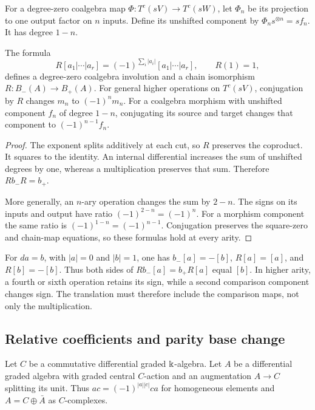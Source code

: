 For a degree-zero coalgebra map
$\Phi:T^c(sV)\to T^c(sW)$, let $\Phi_n$ be its projection to
one output factor on $n$ inputs.  Define its unshifted component by
$\Phi_n s^{\otimes n}=s f_n$.  It has degree $1-n$.

\begin{proposition}
\label{prop:olb-sign-change}
The formula
\[
 R[a_1|\cdots|a_r]=(-1)^{\sum_i|a_i|}[a_1|\cdots|a_r],
 \qquad R(1)=1,
\]
defines a degree-zero coalgebra involution and a chain isomorphism
$R:B_-(A)\to B_+(A)$.
For general higher operations on $T^c(sV)$, conjugation by $R$
changes $m_n$ to $(-1)^n m_n$.
For a coalgebra morphism with unshifted component $f_n$ of degree
$1-n$, conjugating its source and target changes that component
to $(-1)^{n-1}f_n$.
\end{proposition}

\begin{proof}
The exponent splits additively at each cut, so $R$ preserves the
coproduct.  It squares to the identity.
An internal differential increases the sum of unshifted degrees
by one, whereas a multiplication preserves that sum.
Therefore $Rb_-R=b_+$.

More generally, an $n$-ary operation changes the sum by $2-n$.
The signs on its inputs and output have ratio
$(-1)^{2-n}=(-1)^n$.
For a morphism component the same ratio is
$(-1)^{1-n}=(-1)^{n-1}$.
Conjugation preserves the square-zero and chain-map equations,
so these formulas hold at every arity.
\end{proof}

For $da=b$, with $|a|=0$ and $|b|=1$, one has
$b_-[a]=-[b]$, $R[a]=[a]$, and $R[b]=-[b]$.
Thus both sides of $Rb_-[a]=b_+R[a]$ equal $[b]$.
In higher arity, a fourth or sixth operation retains its sign,
while a second comparison component changes sign.
The translation must therefore include the comparison maps, not
only the multiplication.

\subsection{Relative coefficients and parity base change}
\label{sec:olb-relative-signs}

Let $C$ be a commutative differential graded $\Bbbk$-algebra.
Let $A$ be a differential graded algebra with graded central
$C$-action and an augmentation $A\to C$ splitting its unit.
Thus $ac=(-1)^{|a||c|}ca$ for homogeneous elements and
$A=C\oplus\bar A$ as $C$-complexes.

